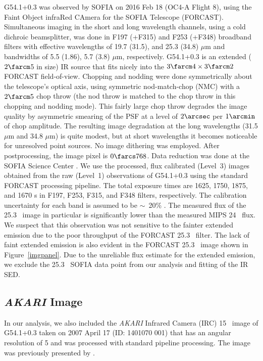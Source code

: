 \documentclass{emulateapj}
\begin{document}
G54.1+0.3 was observed by SOFIA on 2016 Feb 18 (OC4-A Flight 8), using the Faint Object infraRed
CAmera for the SOFIA Telescope (FORCAST). 
Simultaneous imaging in the
short and long wavelength channels, using a cold dichroic beamsplitter,
was done in F197 (+F315) and F253 (+F348) broadband filters with
effective wavelengths of 19.7 (31.5), and 25.3 (34.8) $\mu$m and bandwidths of
5.5 (1.86), 5.7 (3.8) $\mu$m, respectively.
G54.1+0.3 is an extended
($2\farcm$5 in size) IR source that fits nicely into the
$3\farcm 4 \times 3\farcm 2$ FORCAST field-of-view. Chopping and nodding
were done symmetrically about the telescope's optical axis, using symmetric
nod-match-chop (NMC) with a $2\farcm5$ chop throw (the nod throw is matched to
the chop throw in this chopping and nodding mode). This fairly large chop throw
degrades the image quality by asymmetric smearing of the PSF at a level of
$2\arcsec$ per $1\arcmin$ of chop amplitude. The resulting image degradation
at the long wavelengths (31.5 $\mu$m and 34.8 $\mu$m) is quite modest, but at
short wavelengths it becomes noticeable for unresolved point sources.
No image dithering was employed. After postprocessing, the image pixel is
$0\farcs 768$. Data reduction was done at the SOFIA Science Center \citep[see][for a thorough description of data acquisition and reduction for FORCAST observations]{herter13}. We use the processed, flux calibrated
(Level~3) images obtained from the raw (Level~1) observations of G54.1+0.3
using the standard FORCAST processing pipeline. The total exposure times are
1625, 1750, 1875, and 1670 s in F197, F253, F315, and F348 filters,
respectively. The calibration uncertainty for each band is assumed to be $\sim$~20\% \citep{herter13}.
The measured flux of the 25.3 \micron\ image in particular is significantly lower than the measured MIPS 24 \micron\ flux. We suspect that this observation was not sensitive to the fainter extended emission due to the poor throughput of the FORCAST 25.3 \micron\ filter. The lack of faint extended emission is also evident in the FORCAST 25.3 \micron\ image shown in Figure~\ref{imgpanel}. Due to the unreliable flux estimate for the extended emission, we exclude the 25.3 \micron\ SOFIA data point from our analysis and fitting of the IR SED. 

\subsection{\textit{AKARI} Image}

In our analysis, we also included the \textit{AKARI} Infrared Camera (IRC) 15 \micron\ image of G54.1+0.3 taken on 2007 April 17 (ID: 1401070 001) that has an angular resolution of 5 and was processed with standard pipeline processing. The image was previously presented by \citet{koo08}.
\end{document}

